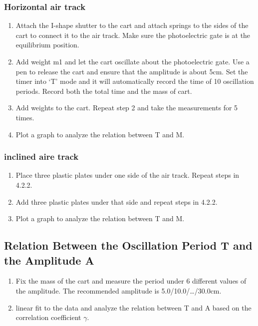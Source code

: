 \documentclass[12pt,a4paper]{article}
\begin{document}
\subsubsection{Horizontal air track}
\begin{enumerate}[1.]
    \item Attach the I-shape shutter to the cart and attach springs to the sides of the cart to connect it to the air track. Make sure the photoelectric gate is at the equilibrium position.
    \item Add weight m1 and let the cart oscillate about the photoelectric gate. Use a pen to release the cart and ensure that the amplitude is about 5cm. Set the timer into ‘T’ mode and it will automatically record the time of 10 oscillation periods. Record both the total time and the mass of cart. 
    \item Add weights to the cart. Repeat step 2 and take the measurements for 5 times.
    \item Plot a graph to analyze the relation between T and M.  
\end{enumerate}

\subsubsection{inclined aire track}
\begin{enumerate}[1.]
    \item Place three plastic plates under one side of the air track. Repeat steps in 4.2.2.
    \item Add three plastic plates under that side and repeat steps in 4.2.2.
    \item Plot a graph to analyze the relation between T and M. 
\end{enumerate}

\subsection{Relation Between the Oscillation Period T and the Amplitude A}
\begin{enumerate}[1.]
    \item  Fix the mass of the cart and measure the period under 6 different values of the amplitude. The recommended amplitude is 5.0/10.0/…/30.0cm.
    \item linear fit to the data and analyze the relation between T and A based on the correlation coefficient $\gamma$.
\end{enumerate}
\end{document}
